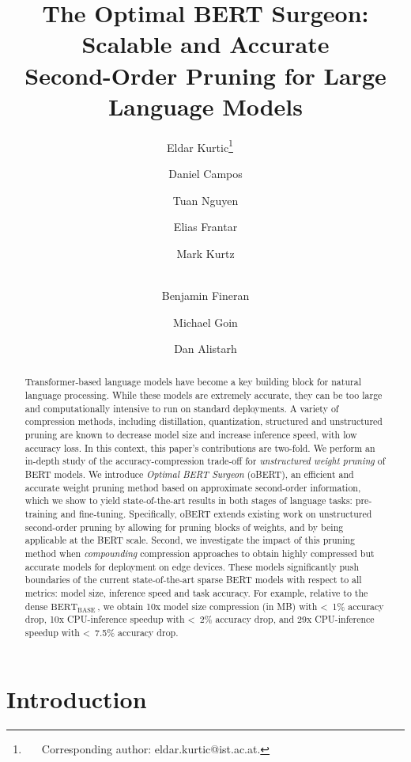 \documentclass[11pt]{article}
\title{The Optimal BERT Surgeon: Scalable and Accurate \\ Second-Order Pruning for Large Language Models}
\newcommand{\bert}{$\textrm{BERT}_{\textrm{BASE}}\,$}
\begin{document}
\author[1]{Eldar Kurtic\thanks{~~~Corresponding author: eldar.kurtic@ist.ac.at.}~~}
\author[2,3]{Daniel Campos}
\author[2]{Tuan Nguyen}
\author[1]{Elias Frantar}
\author[2]{Mark Kurtz}
\author[2]{\\Benjamin Fineran}
\author[2]{Michael Goin}
\author[1,2]{Dan Alistarh}

\maketitle
\begin{abstract}
Transformer-based language models have become a key building block for natural language processing. While these models are extremely accurate, they can be too large and computationally intensive to run on standard deployments. A variety of compression methods, including distillation, quantization, structured and unstructured pruning are known to decrease model size and increase inference speed, with low accuracy loss. 
In this context, this paper's contributions are two-fold. 
We perform an in-depth study of the accuracy-compression trade-off for \emph{unstructured weight pruning} of BERT models. We introduce \emph{Optimal BERT Surgeon} (oBERT), 
an efficient and accurate weight pruning method based on approximate second-order information, which we show to yield state-of-the-art results in both stages of language tasks: pre-training and fine-tuning. Specifically, oBERT extends existing work on unstructured second-order pruning by allowing for pruning blocks of weights, and by being applicable at the BERT scale. Second, we investigate the impact of this pruning method when \emph{compounding} compression approaches to obtain highly compressed but accurate models for deployment on edge devices. These models significantly push boundaries of the current state-of-the-art sparse BERT models with respect to all metrics: model size, inference speed and task accuracy. For example, relative to the dense \bert, we obtain 10x model size compression (in MB) with \hbox{< 1\%} accuracy drop, 10x CPU-inference speedup with \hbox{< 2\%} accuracy drop, and 29x CPU-inference speedup with \hbox{< 7.5\%} accuracy drop.

\end{abstract}
\section{Introduction} 
\end{document}
